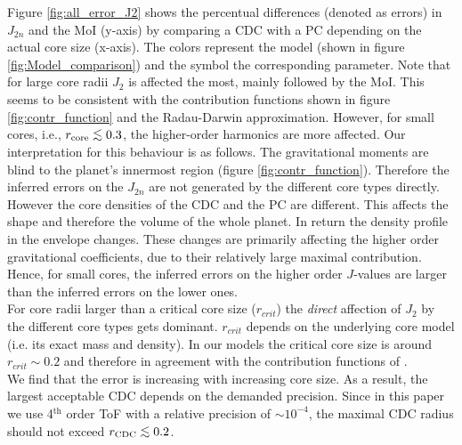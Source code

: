 \documentclass[usenatbib]{mnras}
\def\lsim{\mathrel{\rlap{\lower 3pt \hbox{$\sim$}} \raise 2.0pt \hbox{$<$}}}
\newcommand{\sub}[1]{_{\text{#1}}}
\begin{document}
Figure \ref{fig:all_error_J2} shows the percentual differences (denoted as errors) in $J_{2n}$ and the MoI (y-axis) by comparing a CDC with a PC depending on the actual core size (x-axis). 
The colors represent the model (shown in figure \ref{fig:Model_comparison}) and the symbol the corresponding parameter.  
Note that for large core radii $J_2$ is affected the most, mainly followed by the MoI. This seems to be consistent with the contribution functions shown in figure \ref{fig:contr_function} and the Radau-Darwin approximation. However, for small cores, i.e., $r\sub{core} \lsim{0.3}$, the higher-order harmonics are more affected.  
Our interpretation for this behaviour is as follows. 
The gravitational moments are blind to the planet's innermost region (figure \ref{fig:contr_function}). Therefore the inferred errors on the $J_{2n}$ are not generated by the different core types directly. However the core densities of the CDC and the PC are different. This affects the shape and therefore the volume of the whole planet. In return the density profile in the envelope changes. These changes are primarily affecting the higher order gravitational coefficients, due to their relatively large maximal contribution. Hence, for small cores, the inferred errors on the higher order $J$-values are larger than the inferred errors on the lower ones. \\
For core radii larger than a critical core size ($r_{crit}$) the \textit{direct} affection of $J_2$ by the different core types gets dominant. $r_{crit}$ depends on the underlying core model (i.e. its exact mass and density). In our models the critical core size is around $r_{crit}\sim{0.2}$ and therefore in agreement with the contribution functions of \cite{2011Helled}. \\
We find that the error is increasing with increasing core size. As a result, the largest acceptable CDC depends on the demanded precision. Since in this paper we use 4$^{\text{th}}$ order ToF  with a relative precision of $\sim 10^{-4}$, the maximal CDC radius should not exceed $r_{\text{CDC}}\lsim{0.2}$.
\end{document}

